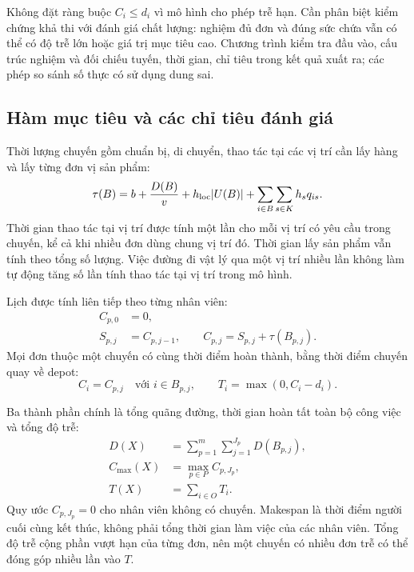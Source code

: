 Không đặt ràng buộc $C_i\leq d_i$ vì mô hình cho phép trễ hạn. Cần phân biệt kiểm chứng khả thi với đánh giá chất lượng: nghiệm đủ đơn và đúng sức chứa vẫn có thể có độ trễ lớn hoặc giá trị mục tiêu cao. Chương trình kiểm tra đầu vào, cấu trúc nghiệm và đối chiếu tuyến, thời gian, chỉ tiêu trong kết quả xuất ra; các phép so sánh số thực có sử dụng dung sai.

\subsection{Hàm mục tiêu và các chỉ tiêu đánh giá}

Thời lượng chuyến gồm chuẩn bị, di chuyển, thao tác tại các vị trí cần lấy hàng và lấy từng đơn vị sản phẩm:
\begin{equation}
 \tau(B)=b+\frac{D(B)}{v}+h_{\rm loc}|U(B)|
 +\sum_{i\in B}\sum_{s\in K}h_sq_{is}.\label{eq:model-duration}
\end{equation}
Thời gian thao tác tại vị trí được tính một lần cho mỗi vị trí có yêu cầu trong chuyến, kể cả khi nhiều đơn dùng chung vị trí đó. Thời gian lấy sản phẩm vẫn tính theo tổng số lượng. Việc đường đi vật lý qua một vị trí nhiều lần không làm tự động tăng số lần tính thao tác tại vị trí trong mô hình.

Lịch được tính liên tiếp theo từng nhân viên:
\begin{align}
 C_{p,0}&=0,\label{eq:model-schedule-origin}\\
 S_{p,j}&=C_{p,j-1},\qquad
 C_{p,j}=S_{p,j}+\tau(B_{p,j}).\label{eq:model-schedule}
\end{align}
Mọi đơn thuộc một chuyến có cùng thời điểm hoàn thành, bằng thời điểm chuyến quay về depot:
\begin{equation}
 C_i=C_{p,j}\quad\text{với }i\in B_{p,j},\qquad
 T_i=\max(0,C_i-d_i).\label{eq:model-order-completion}
\end{equation}

Ba thành phần chính là tổng quãng đường, thời gian hoàn tất toàn bộ công việc và tổng độ trễ:
\begin{align}
 D(X)&=\sum_{p=1}^{m}\sum_{j=1}^{J_p}D(B_{p,j}),\label{eq:model-total-distance}\\
 C_{\max}(X)&=\max_{p\in P}C_{p,J_p},\label{eq:model-makespan}\\
 T(X)&=\sum_{i\in O}T_i.\label{eq:model-total-tardiness}
\end{align}
Quy ước $C_{p,J_p}=0$ cho nhân viên không có chuyến. Makespan là thời điểm người cuối cùng kết thúc, không phải tổng thời gian làm việc của các nhân viên. Tổng độ trễ cộng phần vượt hạn của từng đơn, nên một chuyến có nhiều đơn trễ có thể đóng góp nhiều lần vào $T$.

